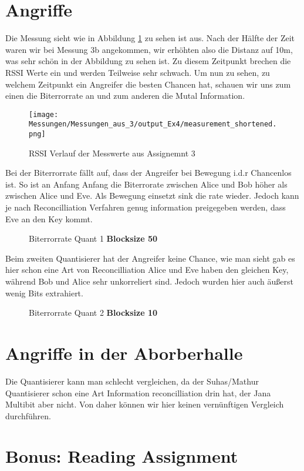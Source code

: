 \documentclass[12pt,a4paper]{article}
\begin{document}
\section{Angriffe}
Die Messung sieht wie in Abbildung \ref{test7} zu sehen ist aus. Nach der Hälfte der Zeit waren wir bei Messung 3b angekommen, wir erhöhten also die Distanz auf 10m, was sehr schön in der Abbildung zu sehen ist. Zu diesem Zeitpunkt brechen die RSSI Werte ein und werden Teilweise sehr schwach. Um nun zu sehen, zu welchem Zeitpunkt ein Angreifer die besten Chancen hat, schauen wir uns zum einen die Biterrorrate an und zum anderen die Mutal Information.
\begin{figure}[H]
\centering
\texttt{[image: Messungen/Messungen\_aus\_3/output\_Ex4/measurement\_shortened.png]}
\caption{RSSI Verlauf der Messwerte aus Assignemnt 3}
\label{test7}
\end{figure}
Bei der Biterrorrate fällt auf, dass der Angreifer bei Bewegung i.d.r Chancenlos ist. So ist an Anfang Anfang die Biterrorate zwischen Alice und Bob höher als zwischen Alice und Eve. Als Bewegung einsetzt sink die rate wieder. Jedoch kann je nach Reconcilliation Verfahren genug information preigegeben werden, dass Eve an den Key kommt.
\begin{figure}[H]
\centering
{} \qquad
{}  
\caption{Biterrorrate Quant 1 \textbf{Blocksize 50}}
\label{fig:7}
\end{figure}
Beim zweiten Quantisierer hat der Angreifer keine Chance, wie man sieht gab es hier schon eine Art von Reconcilliation Alice und Eve haben den gleichen Key, während Bob und Alice sehr unkorreliert sind. Jedoch wurden hier auch äußerst wenig Bits extrahiert.
\begin{figure}[H]
\centering
{} \qquad
{}  
\caption{Biterrorrate Quant 2 \textbf{Blocksize 10}}
\label{fig:8}
\end{figure}
\section{Angriffe in der Aborberhalle}
Die Quantisierer kann man schlecht vergleichen, da der Suhas/Mathur Quantisierer schon eine Art Information reconcilliation drin hat, der Jana Multibit aber nicht. Von daher können wir hier keinen vernünftigen Vergleich durchführen.
\section{Bonus: Reading Assignment}
\end{document}
